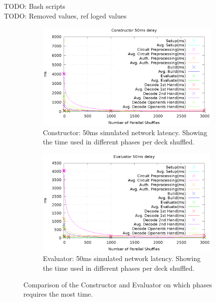 \documentclass[twoside,11pt,openright]{report}
\newcommand{\todo}[1]{}
\renewcommand{\todo}[1]{{\color{red} TODO: {#1}} \\}
\begin{document}
\todo{Bash scripts}

\todo{Removed values, ref loged values}

\begin{figure}
    \label{fig:mesurement_ms}
    \centering

    \begin{subfigure}{\textwidth}
        \label{fig:const_ms_plot}
        \includegraphics[width=\textwidth]{figurs/const_ms_plot.eps}
        \caption{Constructor: 50ms simulated network latency. Showing the time used in different phases per deck shuffled.}
    \end{subfigure}

    \vspace*{1cm}

    \begin{subfigure}{\textwidth}
        \label{fig:eval_ms_plot}
        \includegraphics[width=\textwidth]{figurs/eval_ms_plot.eps}
        \caption{Evaluator: 50ms simulated network latency. Showing the time used in different phases per deck shuffled.}
    \end{subfigure}

\caption{Comparison of the Constructor and Evaluator on which phases requires the most time.}
\end{figure}
\end{document}
